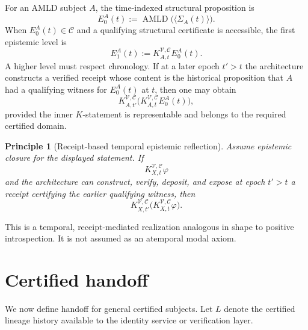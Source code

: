 \documentclass[11pt]{article}
\newtheorem{principle}[definition]{Principle}
\theoremstyle{remark}
\newcommand{\AMLD}{\operatorname{AMLD}}
\newcommand{\K}[4]{K^{#3,#4}_{#1,#2}}
\begin{document}
For an AMLD subject $A$, the time-indexed structural proposition is
\[
E^A_0(t):=\AMLD\bigl(\langle\Sigma_A(t)\rangle\bigr).
\]
When $E^A_0(t)\in\mathcal C$ and a qualifying structural certificate is accessible, the first epistemic level is
\[
E^A_1(t):=\K{A}{t}{\mathcal V}{\mathcal C}E^A_0(t).
\]
A higher level must respect chronology. If at a later epoch $t'>t$ the architecture constructs a verified receipt whose content is the historical proposition that $A$ had a qualifying witness for $E^A_0(t)$ at $t$, then one may obtain
\[
\K{A}{t'}{\mathcal V}{\mathcal C}\bigl(\K{A}{t}{\mathcal V}{\mathcal C}E^A_0(t)\bigr),
\]
provided the inner $K$-statement is representable and belongs to the required certified domain.

\begin{principle}[Receipt-based temporal epistemic reflection]
Assume epistemic closure for the displayed statement. If
\[
\K{X}{t}{\mathcal V}{\mathcal C}\varphi
\]
and the architecture can construct, verify, deposit, and expose at epoch $t'>t$ a receipt certifying the earlier qualifying witness, then
\[
\K{X}{t'}{\mathcal V}{\mathcal C}
\bigl(\K{X}{t}{\mathcal V}{\mathcal C}\varphi\bigr).
\]
\end{principle}

This is a temporal, receipt-mediated realization analogous in shape to positive introspection. It is not assumed as an atemporal modal axiom.

\section{Certified handoff}

We now define handoff for general certified subjects. Let $L$ denote the certified lineage history available to the identity service or verification layer.
\end{document}
